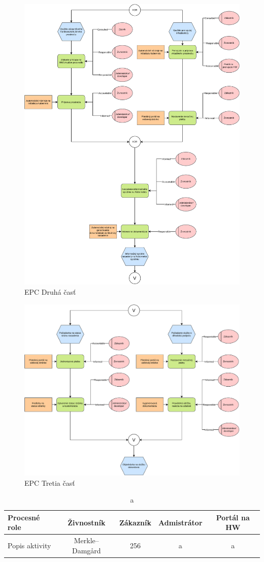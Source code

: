 \begin{figure}[htbp]
  \centering
  \includegraphics[width=\textwidth]{images/EPC_2.pdf}
  \caption{EPC Druhá časť}
\end{figure}

\begin{figure}[htbp]
  \centering
  \includegraphics[width=\textwidth]{images/EPC_3.pdf}
  \caption{EPC Tretia časť}
\end{figure}

\begin{table}[htbp]
  \centering
  \caption{a}
  \begin{tabular}{|l|c|c|c|c|}
    \hline
    Procesné role & Živnostník & Zákazník & Admistrátor & Portál na HW \\
    \hline
    \hline
    Popis aktivity & Merkle–Damgård & 256 & a & a \\
    \hline
    
  \end{tabular}
\end{table}

